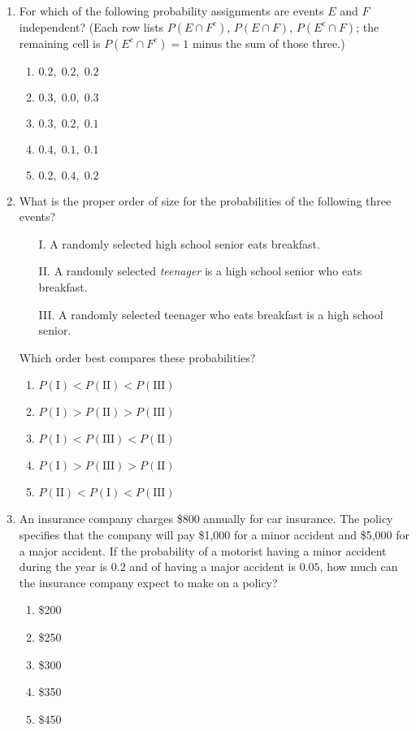 \documentclass{article}
\begin{document}
\begin{enumerate}[label=\textbf{S\arabic*.}]
\item For which of the following probability assignments are events $E$ and $F$
independent? (Each row lists $P(E\cap F^{c})$, $P(E\cap F)$, $P(E^{c}\cap F)$;
the remaining cell is $P(E^{c}\cap F^{c})=1$ minus the sum of those three.)
\begin{enumerate}
  \item $0.2,\;0.2,\;0.2$
  \item $0.3,\;0.0,\;0.3$
  \item $0.3,\;0.2,\;0.1$
  \item $0.4,\;0.1,\;0.1$
  \item $0.2,\;0.4,\;0.2$
\end{enumerate}

\item What is the proper order of size for the probabilities of the following three events?
\begin{itemize}
  \item[I.] A randomly selected high school senior eats breakfast.
  \item[II.] A randomly selected \emph{teenager} is a high school senior who eats breakfast.
  \item[III.] A randomly selected teenager who eats breakfast is a high school senior.
\end{itemize}
Which order best compares these probabilities?
\begin{enumerate}
  \item $P(\text{I})<P(\text{II})<P(\text{III})$
  \item $P(\text{I})>P(\text{II})>P(\text{III})$
  \item $P(\text{I})<P(\text{III})<P(\text{II})$
  \item $P(\text{I})>P(\text{III})>P(\text{II})$
  \item $P(\text{II})<P(\text{I})<P(\text{III})$
\end{enumerate}

\item An insurance company charges \$800 annually for car insurance. The policy specifies that the company will pay \$1{,}000 for a minor accident and \$5{,}000 for a major accident. If the probability of a motorist having a minor accident during the year is $0.2$ and of having a major accident is $0.05$, how much can the insurance company expect to make on a policy? 
\begin{enumerate}
  \item \$200
  \item \$250
  \item \$300
  \item \$350
  \item \$450
\end{enumerate}


\end{enumerate}
\end{document}
